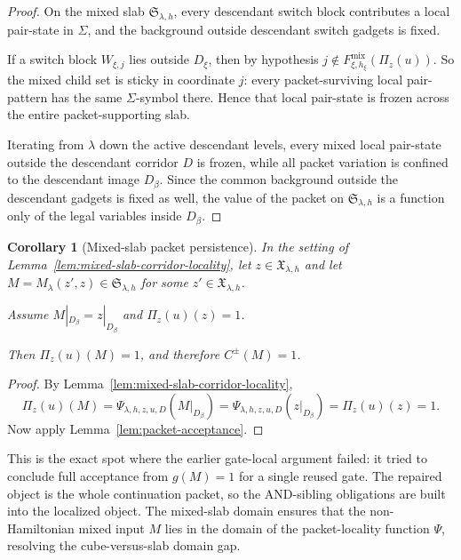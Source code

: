 \documentclass[11pt]{article}
\newtheorem{corollary}[theorem]{Corollary}
\begin{document}
\begin{proof}
On the mixed slab $\mathfrak{S}_{\lambda,h}$, every descendant switch block
contributes a local pair-state in $\Sigma$, and the background outside
descendant switch gadgets is fixed.

If a switch block $W_{\xi,j}$ lies outside $D_\xi$, then by hypothesis
$j\notin F_{\xi,h_\xi}^{\mathrm{mix}}(\Pi_z(u))$.
So the mixed child set is sticky in coordinate $j$: every
packet-surviving local pair-pattern has the same $\Sigma$-symbol there.
Hence that local pair-state is frozen across the entire
packet-supporting slab.

Iterating from $\lambda$ down the active descendant levels, every mixed
local pair-state outside the descendant corridor $D$ is frozen, while all
packet variation is confined to the descendant image $D_\beta$.  Since the
common background outside the descendant gadgets is fixed as well, the
value of the packet on $\mathfrak{S}_{\lambda,h}$ is a function only of the
legal variables inside $D_\beta$.
\end{proof}

\begin{corollary}[Mixed-slab packet persistence]
\label{cor:mixed-slab-packet-persistence}
In the setting of Lemma~\ref{lem:mixed-slab-corridor-locality}, let
$z\in\mathfrak{X}_{\lambda,h}$ and let
$M=M_\lambda(z',z)\in\mathfrak{S}_{\lambda,h}$ for some
$z'\in\mathfrak{X}_{\lambda,h}$.

Assume $M|_{D_\beta}=z|_{D_\beta}$ and $\Pi_z(u)(z)=1$.

Then $\Pi_z(u)(M)=1$, and therefore $C^{\pm}(M)=1$.
\end{corollary}

\begin{proof}
By Lemma~\ref{lem:mixed-slab-corridor-locality},
\[
\Pi_z(u)(M)
=\Psi_{\lambda,h,z,u,D}(M|_{D_\beta})
=\Psi_{\lambda,h,z,u,D}(z|_{D_\beta})
=\Pi_z(u)(z)=1.
\]
Now apply Lemma~\ref{lem:packet-acceptance}.
\end{proof}

This is the exact spot where the earlier gate-local argument failed: it
tried to conclude full acceptance from $g(M)=1$ for a single reused gate.
The repaired object is the whole continuation packet, so the AND-sibling
obligations are built into the localized object.  The mixed-slab domain
ensures that the non-Hamiltonian mixed input $M$ lies in the domain of the
packet-locality function $\Psi$, resolving the cube-versus-slab domain gap.
\end{document}
